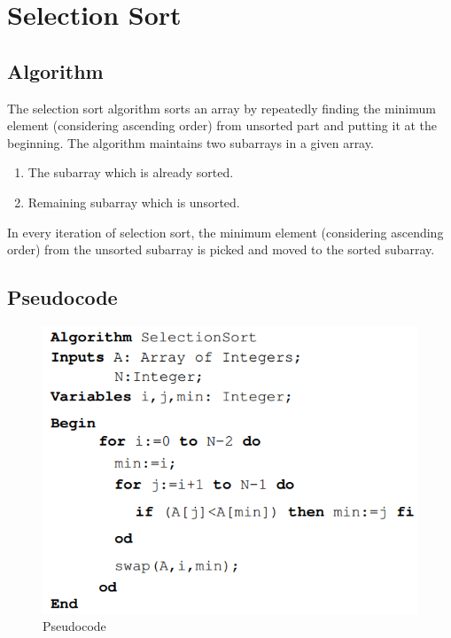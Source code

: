 \documentclass[12pt]{article}
\begin{document}
\section{Selection Sort}
\subsection{Algorithm}
\par The selection sort algorithm sorts an array by repeatedly finding the minimum element (considering ascending order) from unsorted part and putting it at the beginning. The algorithm maintains two subarrays in a given array.
\begin{enumerate}
\item The subarray which is already sorted.
\item Remaining subarray which is unsorted.
\end{enumerate}
\par In every iteration of selection sort, the minimum element (considering ascending order) from the unsorted subarray is picked and moved to the sorted subarray. 
\newpage
\subsection{Pseudocode}
\begin{figure}[h]
        \begin{center}
                \includegraphics[scale=0.7]{Untitled}
        \end{center}
        \caption{Pseudocode}
        \label{fig:shapes}
\end{figure}
\vspace{10pt}
\end{document}
